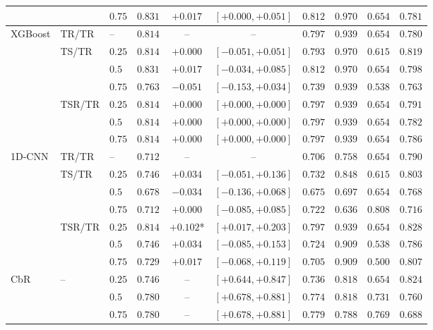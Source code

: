 \begin{table}[H]
\begin{tabular*}{\textwidth}{@{\extracolsep{\fill}}lllccccccc}
 &  & $0.75$ & $0.831$ & $+0.017$ & $[+0.000, +0.051]$ & $0.812$ & $0.970$ & $0.654$ & $0.781$\\
\midrule
\multirow{7}{*}{XGBoost} & TR/TR & -- & $0.814$ & -- & -- & $0.797$ & $0.939$ & $0.654$ & $0.780$\\
\cmidrule(lr){2-10}
 & \multirow{3}{*}{TS/TR} & $0.25$ & $0.814$ & $+0.000$ & $[-0.051, +0.051]$ & $0.793$ & $0.970$ & $0.615$ & $0.819$\\
 &  & $0.5$ & $0.831$ & $+0.017$ & $[-0.034, +0.085]$ & $0.812$ & $0.970$ & $0.654$ & $0.798$\\
 &  & $0.75$ & $0.763$ & $-0.051$ & $[-0.153, +0.034]$ & $0.739$ & $0.939$ & $0.538$ & $0.763$\\
\cmidrule(lr){2-10}
 & \multirow{3}{*}{TSR/TR} & $0.25$ & $0.814$ & $+0.000$ & $[+0.000, +0.000]$ & $0.797$ & $0.939$ & $0.654$ & $0.791$\\
 &  & $0.5$ & $0.814$ & $+0.000$ & $[+0.000, +0.000]$ & $0.797$ & $0.939$ & $0.654$ & $0.782$\\
 &  & $0.75$ & $0.814$ & $+0.000$ & $[+0.000, +0.000]$ & $0.797$ & $0.939$ & $0.654$ & $0.786$\\
\midrule
\multirow{7}{*}{1D-CNN} & TR/TR & -- & $0.712$ & -- & -- & $0.706$ & $0.758$ & $0.654$ & $0.790$\\
\cmidrule(lr){2-10}
 & \multirow{3}{*}{TS/TR} & $0.25$ & $0.746$ & $+0.034$ & $[-0.051, +0.136]$ & $0.732$ & $0.848$ & $0.615$ & $0.803$\\
 &  & $0.5$ & $0.678$ & $-0.034$ & $[-0.136, +0.068]$ & $0.675$ & $0.697$ & $0.654$ & $0.768$\\
 &  & $0.75$ & $0.712$ & $+0.000$ & $[-0.085, +0.085]$ & $0.722$ & $0.636$ & $0.808$ & $0.716$\\
\cmidrule(lr){2-10}
 & \multirow{3}{*}{TSR/TR} & $0.25$ & $0.814$ & $+0.102$* & $[+0.017, +0.203]$ & $0.797$ & $0.939$ & $0.654$ & $0.828$\\
 &  & $0.5$ & $0.746$ & $+0.034$ & $[-0.085, +0.153]$ & $0.724$ & $0.909$ & $0.538$ & $0.786$\\
 &  & $0.75$ & $0.729$ & $+0.017$ & $[-0.068, +0.119]$ & $0.705$ & $0.909$ & $0.500$ & $0.807$\\
\midrule
\multirow{3}{*}{CbR} & \multirow{3}{*}{--} & $0.25$ & $0.746$ & -- & $[+0.644, +0.847]$ & $0.736$ & $0.818$ & $0.654$ & $0.824$\\
 &  & $0.5$ & $0.780$ & -- & $[+0.678, +0.881]$ & $0.774$ & $0.818$ & $0.731$ & $0.760$\\
 &  & $0.75$ & $0.780$ & -- & $[+0.678, +0.881]$ & $0.779$ & $0.788$ & $0.769$ & $0.688$\\

\end{tabular*}
\end{table}
